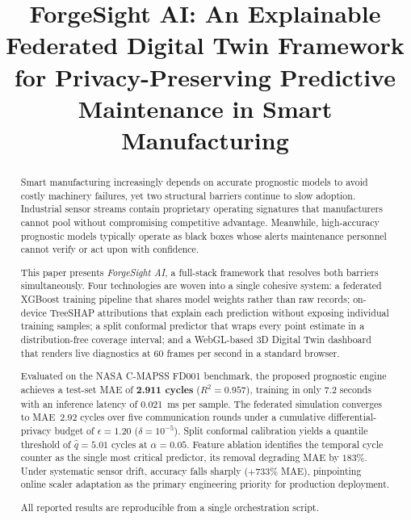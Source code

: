 \documentclass[10pt, journal, letterpaper]{IEEEtran}
\begin{document}
\title{ForgeSight AI: An Explainable Federated Digital Twin Framework
       for Privacy-Preserving Predictive Maintenance in Smart Manufacturing}

\author{%
  \and
}

\maketitle

\begin{abstract}
Smart manufacturing increasingly depends on accurate prognostic models to
avoid costly machinery failures, yet two structural barriers continue to slow
adoption. Industrial sensor streams contain proprietary operating signatures
that manufacturers cannot pool without compromising competitive advantage.
Meanwhile, high-accuracy prognostic models typically operate as black boxes
whose alerts maintenance personnel cannot verify or act upon with confidence.

This paper presents \emph{ForgeSight AI}, a full-stack framework that resolves
both barriers simultaneously. Four technologies are woven into a single
cohesive system: a federated XGBoost training pipeline that shares model
weights rather than raw records; on-device TreeSHAP attributions that explain
each prediction without exposing individual training samples; a split conformal
predictor that wraps every point estimate in a distribution-free coverage
interval; and a WebGL-based 3D Digital Twin dashboard that renders live
diagnostics at 60 frames per second in a standard browser.

Evaluated on the NASA C-MAPSS FD001 benchmark, the proposed prognostic engine
achieves a test-set MAE of \textbf{2.911 cycles} ($R^2 = 0.957$), training in
only 7.2 seconds with an inference latency of 0.021~ms per sample. The
federated simulation converges to MAE~2.92 cycles over five communication
rounds under a cumulative differential-privacy budget of $\epsilon = 1.20$
($\delta = 10^{-5}$). Split conformal calibration yields a quantile threshold
of $\hat{q} = 5.01$ cycles at $\alpha = 0.05$. Feature ablation identifies
the temporal cycle counter as the single most critical predictor, its removal
degrading MAE by $183\%$. Under systematic sensor drift, accuracy falls
sharply ($+733\%$ MAE), pinpointing online scaler adaptation as the primary
engineering priority for production deployment.

All reported results are reproducible from a single orchestration script.
\end{abstract}
\end{document}
